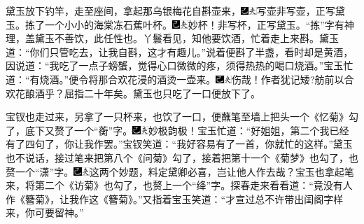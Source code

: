 黛玉放下钓竿，走至座间，拿起那乌银梅花自斟壶来，{\includegraphics[width=3mm]{../Images/00003}\includegraphics[width=3mm]{../Images/00012}\footnotesize \kaishu 写壶非写壶，正写黛玉。}拣了一个小小的海棠冻石蕉叶杯。{\includegraphics[width=3mm]{../Images/00003}\includegraphics[width=3mm]{../Images/00012}\footnotesize \kaishu 妙杯！非写杯，正写黛玉。``拣''字有神理，盖黛玉不善饮，此任性也。}丫鬟看见，知他要饮酒，忙着走上来斟。黛玉道：``你们只管吃去，让我自斟，这才有趣儿。''说着便斟了半盏，看时却是黄酒，因说道：``我吃了一点子螃蟹，觉得心口微微的疼，须得热热的喝口烧酒。''宝玉忙道：``有烧酒。''便令将那合欢花浸的酒烫一壶来。{{\includegraphics[width=3mm]{../Images/00003}\includegraphics[width=3mm]{../Images/00012}\footnotesize \kaishu 伤哉！作者犹记矮}?{舫前以合欢花酿酒乎？屈指二十年矣。}}黛玉也只吃了一口便放下了。

宝钗也走过来，另拿了一只杯来，也饮了一口，便蘸笔至墙上把头一个《忆菊》勾了，底下又赘了一个``蘅''字。{\includegraphics[width=3mm]{../Images/00003}\includegraphics[width=3mm]{../Images/00012}\footnotesize \kaishu 妙极韵极！}宝玉忙道：``好姐姐，第二个我已经有了四句了，你让我作罢。''宝钗笑道：``我好容易有了一首，你就忙的这样。''黛玉也不说话，接过笔来把第八个《问菊》勾了，接着把第十一个《菊梦》也勾了，也赘一个``潇''字。{\includegraphics[width=3mm]{../Images/00003}\includegraphics[width=3mm]{../Images/00012}\footnotesize \kaishu 这两个妙题，料定黛卿必喜，岂让他人作去哉？}宝玉也拿起笔来，将第二个《访菊》也勾了，也赘上一个``绛''字。探春走来看看道：``竟没有人作《簪菊》，让我作这《簪菊》。''又指着宝玉笑道：``才宣过总不许带出闺阁字样来，你可要留神。''

